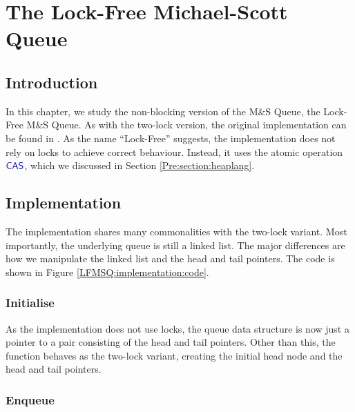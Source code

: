 \documentclass[a4paper, 10pt]{report}
\theoremstyle{definition}
\newcommand{\msq}{M\&S Queue}
\newcommand{\lfmsq}{Lock-Free \msq{}}
\begin{document}
\chapter{The Lock-Free Michael-Scott Queue}
\label{ch:LFMSQ}

\section{Introduction}
\label{LFMSQ:section:introduction}

In this chapter, we study the non-blocking version of the \msq{}, the \lfmsq{}. As with the two-lock version, the original implementation can be found in \citet{DBLP:conf/podc/MichaelS96}. As the name ``Lock-Free'' suggests, the implementation does not rely on locks to achieve correct behaviour. Instead, it uses the atomic operation $\textsf{\color{blue} CAS}$, which we discussed in Section \ref{Pre:section:heaplang}.

\section{Implementation}
\label{LFMSQ:section:implementation}

The implementation shares many commonalities with the two-lock variant. Most importantly, the underlying queue is still a linked list. The major differences are how we manipulate the linked list and the head and tail pointers. The code is shown in Figure \ref{LFMSQ:implementation:code}.

\subsection{Initialise}
\label{LFMSQ:implementation:sub:initialise}

As the implementation does not use locks, the queue data structure is now just a pointer to a pair consisting of the head and tail pointers. Other than this, the function behaves as the two-lock variant, creating the initial head node and the head and tail pointers.

\subsection{Enqueue}
\label{LFMSQ:implementation:sub:enqueue}
\end{document}
